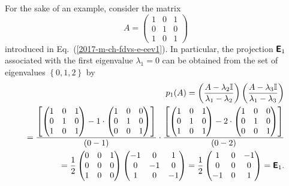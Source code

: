 {\color{blue}
\bexample
For the sake of an example, consider the matrix
\begin{equation}
A=
\begin{pmatrix}
1&0&1\\
0&1&0\\
1&0&1
\end{pmatrix}
\end{equation}
introduced in Eq.~(\ref{2017-m-ch-fdvs-e-eev1}).
In particular, the projection $\textsf{\textbf{E}}_1$ associated with the first eigenvalue $\lambda_1=0$
can be obtained from  the set of eigenvalues $\left\{  0,1,2 \right\}$ by
\begin{equation}
\begin{split}
p_1(A)=
\left( \frac{A-\lambda_2{\Bbb I}}{\lambda_1-\lambda_2} \right)
\left( \frac{A-\lambda_3{\Bbb I}}{\lambda_1-\lambda_3} \right) \\
=
\frac{
\left[
\begin{pmatrix}
1&0&1\\
0&1&0\\
1&0&1
\end{pmatrix}
-
1\cdot
\begin{pmatrix}
1&0&0\\
0&1&0\\
0&0&1
\end{pmatrix}
\right]}
{(0-1)}
\cdot
\frac{
\left[
\begin{pmatrix}
1&0&1\\
0&1&0\\
1&0&1
\end{pmatrix}
-
2\cdot
\begin{pmatrix}
1&0&0\\
0&1&0\\
0&0&1
\end{pmatrix}
\right]}
{(0-2)}
\\
=
\frac{1}{2}
\begin{pmatrix}
0&0&1\\
0&0&0\\
1&0&0
\end{pmatrix}
\begin{pmatrix}
-1&0&1\\
0&-1&0\\
1&0&-1
\end{pmatrix}
=
\frac{1}{2}
\begin{pmatrix}
1&0&-1\\
0&0&0\\
-1&0&1
\end{pmatrix}
=\textsf{\textbf{E}}_1.
\end{split}
\end{equation}

}
